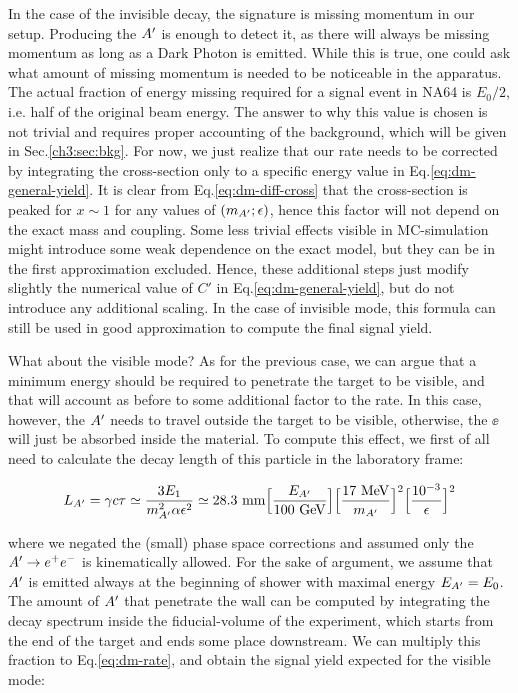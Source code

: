 In the case of the invisible decay, the signature is missing momentum in our setup. Producing the $A'$ is enough to detect it, as there will always be missing momentum as long as a Dark Photon is emitted. While this is true, one could ask what amount of missing momentum is needed to be noticeable in the apparatus. The actual fraction of energy missing required for a signal event in NA64 is $E_0/2$, i.e. half of the original beam energy. The answer to why this value is chosen is not trivial and requires proper accounting of the background, which will be given in Sec.\ref{ch3:sec:bkg}.  For now, we just realize that our rate needs to be corrected by integrating the cross-section only to a specific energy value in Eq.\ref{eq:dm-general-yield}. It is clear from Eq.\ref{eq:dm-diff-cross} that the cross-section is peaked for $x \sim 1$ for any values of $(m_{A'};\epsilon)$, hence this factor will not depend on the exact mass and coupling. Some less trivial effects visible in MC-simulation might introduce some weak dependence on the exact model, but they can be in the first approximation excluded. Hence, these additional steps just modify slightly the numerical value of $C'$ in Eq.\ref{eq:dm-general-yield}, but do not introduce any additional scaling. In the case of invisible mode, this formula can still be used in good approximation to compute the final signal yield.

What about the visible mode? As for the previous case, we can argue that a minimum energy should be required to penetrate the target to be visible, and that will account as before to some additional factor to the rate. In this case, however, the $A'$ needs to travel outside the target to be visible, otherwise, the $\ee$ will just be absorbed inside the material. To compute this effect, we first of all need to calculate the decay length of this particle in the laboratory frame:

\begin{eqnarray}
  L_{A'} = \gamma c \tau \simeq \frac{3E_1}{m^2_{A'}\alpha \epsilon^2} \simeq 28.3 ~{\rm mm}  \Bigl[\frac{E_{A'}}{100~ {\rm GeV}}\Bigr] 
  \Bigl[\frac{17~ {\rm MeV}}{m_{A'}}\Bigr]^2 \Bigl[\frac{10^{-3}}{\epsilon}\Bigr]^2
  \label{eq:dm-decay-length}
\end{eqnarray}

where we negated the (small) phase space corrections and assumed only the $A' \to e^+e^-$ is kinematically allowed. For the sake of argument, we assume that $A'$ is emitted always at the beginning of shower with maximal energy $E_{A'} = E_0$. The amount of $A'$ that penetrate the wall can be computed by integrating the decay spectrum inside the fiducial-volume of the experiment, which starts from the end of the target and ends some place downstream. We can multiply this fraction to Eq.\ref{eq:dm-rate}, and obtain the signal yield expected for the visible mode:

